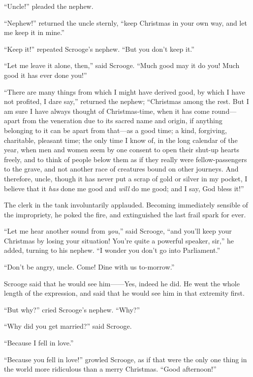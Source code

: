 \documentclass[paper=a5,BCOR=15mm,twoside,DIV=15,headinclude=off,12pt,chapterprefix=off,openany,headings=huge]{scrbook} %
\begin{document}
\enquote{Uncle!} pleaded the nephew.

\enquote{Nephew!} returned the uncle sternly, \enquote{keep Christmas in your own way, and let me keep it in mine.}

\enquote{Keep it!} repeated Scrooge's nephew. \enquote{But you don't keep it.}

\enquote{Let me leave it alone, then,} said Scrooge. \enquote{Much good may it do you! Much good it has ever done you!}

\enquote{There are many things from which I might have derived good, by which I have not profited, I dare say,} returned the nephew; \enquote{Christmas among the rest. But I am sure I have always thought of Christmas-time, when it has come round—apart from the veneration due to its sacred name and origin, if anything belonging to it can be apart from that—as a good time; a kind, forgiving, charitable, pleasant time; the only time I know of, in the long calendar of the year, when men and women seem by one consent to open their shut-up hearts freely, and to think of people below them as if they really were fellow-passengers to the grave, and not another race of creatures bound on other journeys. And therefore, uncle, though it has never put a scrap of gold or silver in my pocket, I believe that it \textit{has} done me good and \textit{will} do me good; and I say, God bless it!}

The clerk in the tank involuntarily applauded. Becoming immediately sensible of the impropriety, he poked the fire, and extinguished the last frail spark for ever.

\enquote{Let me hear another sound from \textit{you},} said Scrooge, \enquote{and you'll keep your Christmas by losing your situation! You're quite a powerful speaker, sir,} he added, turning to his nephew. \enquote{I wonder you don't go into Parliament.}

\enquote{Don't be angry, uncle. Come! Dine with us to-morrow.}

Scrooge said that he would see him——Yes, indeed he did. He went the whole length of the expression, and said that he would see him in that extremity first.

\enquote{But why?} cried Scrooge's nephew. \enquote{Why?}

\enquote{Why did you get married?} said Scrooge.

\enquote{Because I fell in love.}

\enquote{Because you fell in love!} growled Scrooge, as if that were the only one thing in the world more ridiculous than a merry Christmas. \enquote{Good afternoon!}
\end{document}
